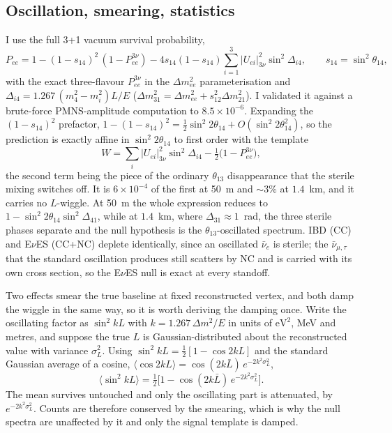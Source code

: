 \documentclass[aps,prd,superscriptaddress,nofootinbib,longbibliography,notitlepage,11pt]{revtex4-2}
\newcommand{\eves}{E$\nu$ES}
\newcommand{\dmee}{\Delta m^2_{ee}}
\newcommand{\dm}[1]{\Delta m^2_{#1}}
\newcommand{\st}[1]{\sin^2 2\theta_{#1}}
\begin{document}
\subsection{Oscillation, smearing, statistics}
I use the full 3+1 vacuum survival probability,
\begin{equation}
P_{ee}=1-(1-s_{14})^2\,(1-P^{3\nu}_{ee})-4s_{14}(1-s_{14})\sum_{i=1}^{3}|U_{ei}|^2_{3\nu}
\sin^2\Delta_{i4},\qquad s_{14}=\sin^2\theta_{14},
\end{equation}
with the exact three-flavour $P^{3\nu}_{ee}$ in the $\dmee$ parameterisation
\cite{Minakata:2006gq} and $\Delta_{i4}=1.267\,(m_4^2-m_i^2)L/E$
($\dm{31}=\dmee+s_{12}^2\dm{21}$).  I validated it against a brute-force PMNS-amplitude
computation to $8.5\times10^{-6}$.  Expanding the $(1-s_{14})^2$ prefactor,
$1-(1-s_{14})^2=\tfrac12\st{14}+O(\st{14}^2)$, so the prediction is exactly affine in
$\st{14}$ to first order with the template
\begin{equation}
W=\sum_{i}|U_{ei}|^2_{3\nu}\sin^2\Delta_{i4}-\tfrac12\big(1-P^{3\nu}_{ee}\big),
\label{eq:wtemplate}
\end{equation}
the second term being the piece of the ordinary $\theta_{13}$ disappearance that the
sterile mixing switches off.  It is $6\times10^{-4}$ of the first at 50~m and $\sim3\%$ at
$1.4$~km, and it carries no $L$-wiggle.  At 50~m the whole expression reduces to
$1-\st{14}\sin^2\Delta_{41}$,
while at $1.4$~km, where $\Delta_{31}\approx1$~rad, the three sterile phases separate and
the null hypothesis is the $\theta_{13}$-oscillated spectrum.  IBD (CC) and \eves{}
(CC+NC) deplete identically, since an oscillated $\bar\nu_e$ is sterile; the
$\bar\nu_{\mu,\tau}$ that the standard oscillation produces still scatters by NC and is
carried with its own cross section, so the \eves{} null is exact at every standoff.

Two effects smear the true baseline at fixed reconstructed vertex, and both damp the
wiggle in the same way, so it is worth deriving the damping once.  Write the oscillating
factor as $\sin^{2}kL$ with $k=1.267\,\dm{}/E$ in units of $\mathrm{eV^{2}}$, MeV and
metres, and suppose the true $L$ is Gaussian-distributed about the reconstructed value with
variance $\sigma_L^{2}$.  Using $\sin^{2}kL=\tfrac12[1-\cos2kL]$ and the standard Gaussian
average of a cosine, $\langle\cos2kL\rangle=\cos(2k\bar L)\,e^{-2k^{2}\sigma_L^{2}}$,
\begin{equation}
\big\langle\sin^{2}kL\big\rangle
=\tfrac12\Big[1-\cos(2k\bar L)\,e^{-2k^{2}\sigma_L^{2}}\Big].
\label{eq:damping}
\end{equation}
The mean survives untouched and only the oscillating part is attenuated, by
$e^{-2k^{2}\sigma_L^{2}}$.  Counts are therefore conserved by the smearing, which is why
the null spectra are unaffected by it and only the signal template is damped.
\end{document}
